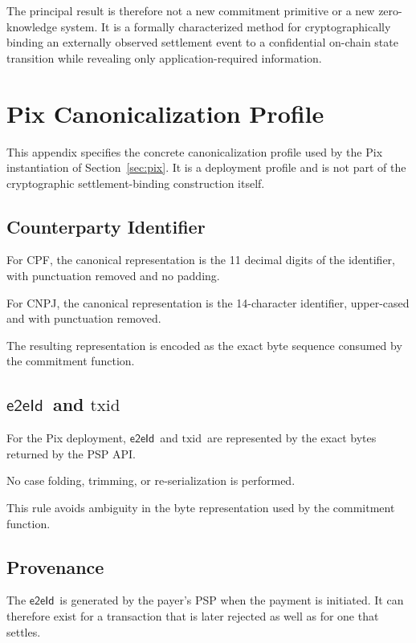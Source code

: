 \documentclass[10pt,twocolumn]{article}
\newcommand{\eeid}{\ensuremath{\mathsf{e2eId}}}
\newcommand{\txid}{\ensuremath{\text{txid}}}
\begin{document}
The principal result is therefore not a new commitment primitive or a
new zero-knowledge system. It is a formally characterized method for
cryptographically binding an externally observed settlement event to a
confidential on-chain state transition while revealing only
application-required information.

\appendix

\section{Pix Canonicalization Profile}
\label{app:pix}

This appendix specifies the concrete canonicalization profile used by
the Pix instantiation of Section~\ref{sec:pix}. It is a deployment
profile and is not part of the cryptographic settlement-binding
construction itself.

\subsection{Counterparty Identifier}

For CPF, the canonical representation is the 11 decimal digits of the
identifier, with punctuation removed and no padding.

For CNPJ, the canonical representation is the 14-character identifier,
upper-cased and with punctuation removed.

The resulting representation is encoded as the exact byte sequence
consumed by the commitment function.

\subsection{\eeid\ and \txid}

For the Pix deployment, \eeid\ and \txid\ are represented by the exact
bytes returned by the PSP API.

No case folding, trimming, or re-serialization is performed.

This rule avoids ambiguity in the byte representation used by the
commitment function.

\subsection{Provenance}

The \eeid\ is generated by the payer's PSP when the payment is
initiated. It can therefore exist for a transaction that is later
rejected as well as for one that settles.
\end{document}
